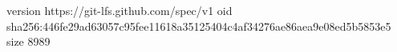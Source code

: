 version https://git-lfs.github.com/spec/v1
oid sha256:446fe29ad63057c95fee11618a35125404c4af34276ae86aea9e08ed5b5853e5
size 8989
